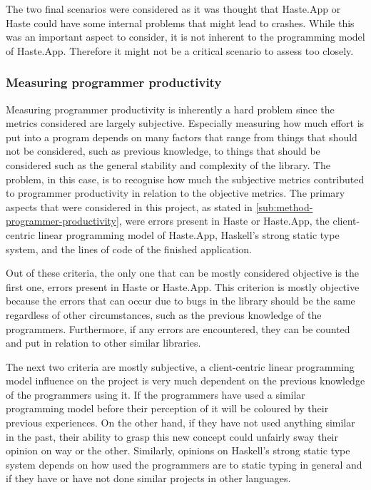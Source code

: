 \documentclass[a4paper]{article}
\begin{document}
The two final scenarios were considered as it was thought that Haste.App or Haste could have some internal problems that might lead to crashes. While this was an important aspect to consider, it is not inherent to the programming model of Haste.App. Therefore it might not be a critical scenario to assess too closely.



\subsubsection{Measuring programmer productivity}%
Measuring programmer productivity is inherently a hard problem since the metrics considered are largely subjective. Especially measuring how much effort is put into a program depends on many factors that range from things that should not be considered, such as previous knowledge, to things that should be considered such as the general stability and complexity of the library. The problem, in this case, is to recognise how much the subjective metrics contributed to programmer productivity in relation to the objective metrics. The primary aspects that were considered in this project, as stated in \cref{sub:method-programmer-productivity}, were errors present in Haste or Haste.App, the client-centric linear programming model of Haste.App, Haskell's strong static type system, and the lines of code of the finished application.

Out of these criteria, the only one that can be mostly considered objective is the first one, errors present in Haste or Haste.App. This criterion is mostly objective because the errors that can occur due to bugs in the library should be the same regardless of other circumstances, such as the previous knowledge of the programmers. Furthermore, if any errors are encountered, they can be counted and put in relation to other similar libraries.

The next two criteria are mostly subjective, a client-centric linear programming model influence on the project is very much dependent on the previous knowledge of the programmers using it. If the programmers have used a similar programming model before their perception of it will be coloured by their previous experiences. On the other hand, if they have not used anything similar in the past, their ability to grasp this new concept could unfairly sway their opinion on way or the other. Similarly, opinions on Haskell's strong static type system depends on how used the programmers are to static typing in general and if they have or have not done similar projects in other languages.
\end{document}
